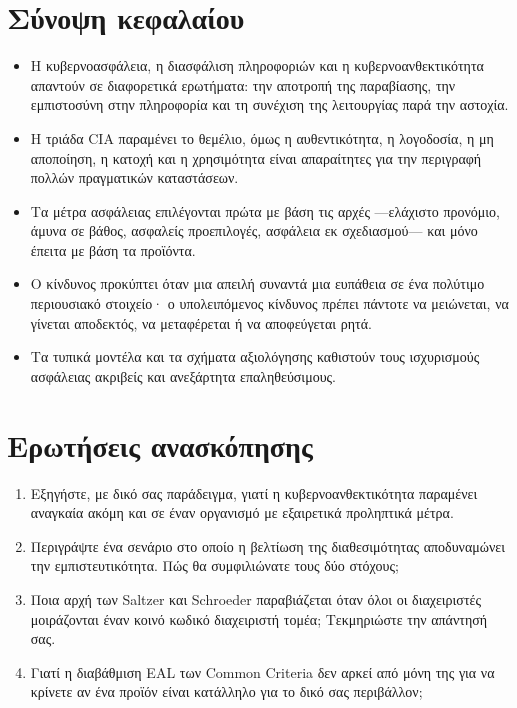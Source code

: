 \documentclass[11pt,openany]{book}
\begin{document}
\section*{Σύνοψη κεφαλαίου}
\begin{itemize}
  \item Η κυβερνοασφάλεια, η διασφάλιση πληροφοριών και η κυβερνοανθεκτικότητα απαντούν σε διαφορετικά ερωτήματα: την αποτροπή της παραβίασης, την εμπιστοσύνη στην πληροφορία και τη συνέχιση της λειτουργίας παρά την αστοχία.
  \item Η τριάδα CIA παραμένει το θεμέλιο, όμως η αυθεντικότητα, η λογοδοσία, η μη αποποίηση, η κατοχή και η χρησιμότητα είναι απαραίτητες για την περιγραφή πολλών πραγματικών καταστάσεων.
  \item Τα μέτρα ασφάλειας επιλέγονται πρώτα με βάση τις αρχές —ελάχιστο προνόμιο, άμυνα σε βάθος, ασφαλείς προεπιλογές, ασφάλεια εκ σχεδιασμού— και μόνο έπειτα με βάση τα προϊόντα.
  \item Ο κίνδυνος προκύπτει όταν μια απειλή συναντά μια ευπάθεια σε ένα πολύτιμο περιουσιακό στοιχείο· ο υπολειπόμενος κίνδυνος πρέπει πάντοτε να μειώνεται, να γίνεται αποδεκτός, να μεταφέρεται ή να αποφεύγεται ρητά.
  \item Τα τυπικά μοντέλα και τα σχήματα αξιολόγησης καθιστούν τους ισχυρισμούς ασφάλειας ακριβείς και ανεξάρτητα επαληθεύσιμους.
\end{itemize}

\section*{Ερωτήσεις ανασκόπησης}
\begin{enumerate}
  \item Εξηγήστε, με δικό σας παράδειγμα, γιατί η κυβερνοανθεκτικότητα παραμένει αναγκαία ακόμη και σε έναν οργανισμό με εξαιρετικά προληπτικά μέτρα.
  \item Περιγράψτε ένα σενάριο στο οποίο η βελτίωση της διαθεσιμότητας αποδυναμώνει την εμπιστευτικότητα. Πώς θα συμφιλιώνατε τους δύο στόχους;
  \item Ποια αρχή των Saltzer και Schroeder παραβιάζεται όταν όλοι οι διαχειριστές μοιράζονται έναν κοινό κωδικό διαχειριστή τομέα; Τεκμηριώστε την απάντησή σας.
  \item Γιατί η διαβάθμιση EAL των Common Criteria δεν αρκεί από μόνη της για να κρίνετε αν ένα προϊόν είναι κατάλληλο για το δικό σας περιβάλλον;
\end{enumerate}

\end{document}
